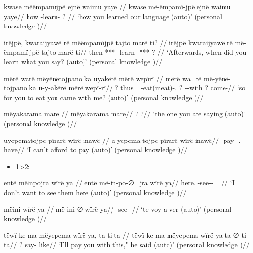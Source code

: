 \documentclass{memoir}
\begin{document}
\xe

\pex\label{learn}    
\a \label{convhistfamsjm-15}
\begingl \glpreamble kwase mëëmpamïjpë ejnë waimu yaye //
\gla kwase më-ëmpamï-jpë ejnë waimu yaye//
\glb how -learn-  ? //
\glft ‘how you learned our language (auto)’ (personal knowledge
)//
\endgl

    
\a \label{convhistfamsjm-238}
\begingl \glpreamble irëjpë, kwaraijyawë rë mëëmpamïjpë tajto marë ti? //
\gla irëjpë kwaraijyawë rë më-ëmpamï-jpë tajto marë ti//
\glb then ***  -learn- *** ? //
\glft ‘Afterwards, when did you learn what you say? (auto)’ (personal knowledge
)//
\endgl

\xe

\pex\label{2sub}    
\a \label{convfemgrme-43}
\begingl \glpreamble mërë warë mëyënëtojpano ka uyakërë mërë wepïrï //
\gla mërë wa=rë më-yënë-tojpano ka u-y-akërë mërë wepï-rï//
\glb ? thus= -eat(meat)-. ? --with ? come-//
\glft ‘so for you to eat you came with me? (auto)’ (personal knowledge
)//
\endgl

    
\a \label{ctoaragrme-5}
\begingl \glpreamble mëyakarama mare //
\gla mëyakarama mare//
\glb ? ?//
\glft ‘the one you are saying (auto)’ (personal knowledge
)//
\endgl

\xe

\ex \label{1sub}
\begingl \glpreamble uyepematojpe pïrarë wïrë inawë //
\gla u-yepema-tojpe pïrarë wïrë inawë//
\glb {}-pay- .  have//
\glft ‘I can't afford to pay (auto)’ (personal knowledge
)//
\endgl
\xe

\begin{itemize}
\tightlist
\item
  1\textgreater2:
\end{itemize}

\pex    
\a \label{convfemgrme-231}
\begingl \glpreamble entë mëinpojra wïrë ya //
\gla entë më-in-po-∅=jra wïrë ya//
\glb here. -see--=  //
\glft ‘I don't want to see them here (auto)’ (personal knowledge
)//
\endgl

    
\a \label{convfemgrme-232}
\begingl \glpreamble mëini wïrë ya //
\gla më-ini-∅ wïrë ya//
\glb {}-see-  //
\glft ‘te voy a ver (auto)’ (personal knowledge
)//
\endgl

    
\a \label{ctovarmafl-283}
\begingl \glpreamble tëwï ke ma mëyepema wïrë ya, ta ti ta //
\gla tëwï ke ma mëyepema wïrë ya ta-∅ ti ta//
\glb {}   ?   say-  like//
\glft ‘I'll pay you with this," he said (auto)’ (personal knowledge
)//
\endgl
\end{document}
